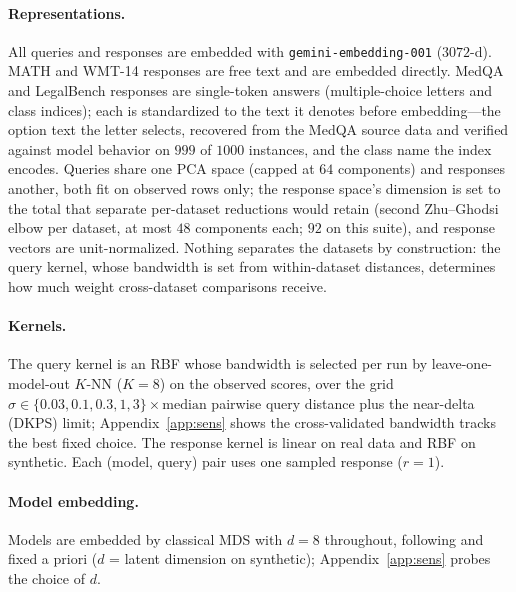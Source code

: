 \documentclass{article}
\theoremstyle{definition}
\theoremstyle{plain}
\begin{document}
\paragraph{Representations.} All queries and responses are embedded with
\texttt{gemini-embedding-001} ($3072$-d). MATH and WMT-14 responses are free text and
are embedded directly. MedQA and LegalBench responses are single-token answers
(multiple-choice letters and class indices); each is standardized to the text it
denotes before embedding---the option text the letter selects, recovered from the
MedQA source data and verified against model behavior on $999$ of $1000$ instances,
and the class name the index encodes. Queries share one PCA space (capped at $64$
components) and responses another, both fit on observed rows only; the response
space's dimension is set to the total that separate per-dataset reductions would
retain (second Zhu--Ghodsi elbow per dataset, at most $48$ components each; $92$ on
this suite), and response vectors are unit-normalized. Nothing separates the datasets
by construction: the query kernel, whose bandwidth is set from within-dataset
distances, determines how much weight cross-dataset comparisons receive.

\paragraph{Kernels.} The query kernel is an RBF whose bandwidth is selected per run by
leave-one-model-out $K$-NN ($K{=}8$) on the observed scores, over the grid
$\sigma\in\{0.03,0.1,0.3,1,3\}\times\mathrm{median}$ pairwise query distance plus the
near-delta (DKPS) limit; Appendix~\ref{app:sens} shows the cross-validated bandwidth
tracks the best fixed choice. The response kernel is linear on real data and RBF on
synthetic. Each (model, query) pair uses one sampled response ($r{=}1$).

\paragraph{Model embedding.} Models are embedded by classical MDS with $d{=}8$
throughout, following \citet{dkps_qeff} and fixed a priori ($d$ = latent dimension on
synthetic); Appendix~\ref{app:sens} probes the choice of $d$.
\end{document}
